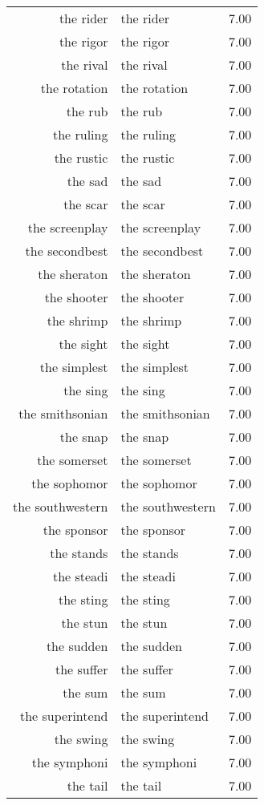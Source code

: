 \begin{table}[ht]
\begin{tabular}{rlr}
  the rider & the rider & 7.00 \\ 
  the rigor & the rigor & 7.00 \\ 
  the rival & the rival & 7.00 \\ 
  the rotation & the rotation & 7.00 \\ 
  the rub & the rub & 7.00 \\ 
  the ruling & the ruling & 7.00 \\ 
  the rustic & the rustic & 7.00 \\ 
  the sad & the sad & 7.00 \\ 
  the scar & the scar & 7.00 \\ 
  the screenplay & the screenplay & 7.00 \\ 
  the secondbest & the secondbest & 7.00 \\ 
  the sheraton & the sheraton & 7.00 \\ 
  the shooter & the shooter & 7.00 \\ 
  the shrimp & the shrimp & 7.00 \\ 
  the sight & the sight & 7.00 \\ 
  the simplest & the simplest & 7.00 \\ 
  the sing & the sing & 7.00 \\ 
  the smithsonian & the smithsonian & 7.00 \\ 
  the snap & the snap & 7.00 \\ 
  the somerset & the somerset & 7.00 \\ 
  the sophomor & the sophomor & 7.00 \\ 
  the southwestern & the southwestern & 7.00 \\ 
  the sponsor & the sponsor & 7.00 \\ 
  the stands & the stands & 7.00 \\ 
  the steadi & the steadi & 7.00 \\ 
  the sting & the sting & 7.00 \\ 
  the stun & the stun & 7.00 \\ 
  the sudden & the sudden & 7.00 \\ 
  the suffer & the suffer & 7.00 \\ 
  the sum & the sum & 7.00 \\ 
  the superintend & the superintend & 7.00 \\ 
  the swing & the swing & 7.00 \\ 
  the symphoni & the symphoni & 7.00 \\ 
  the tail & the tail & 7.00 \\ 

\end{tabular}
\end{table}
